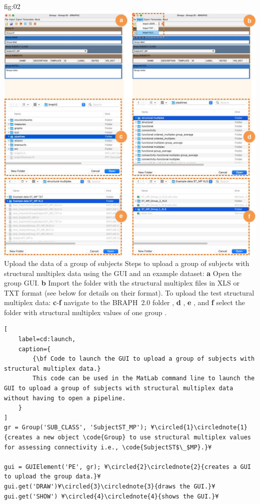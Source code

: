 \documentclass[justified]{tufte-handout}
\begin{document}
	{fig:02}
	{
	\includegraphics{fig02.jpg}
	}
	{Upload the data of a group of subjects}
	{
	Steps to upload a group of subjects with structural multiplex data using the GUI and an example dataset: 
	{\bf a} Open the group GUI.
	{\bf b} Import the folder with the structural multiplex files in XLS or TXT format (see below for details on their format).
	To upload the test structural multiplex data:
	{\bf c}-{\bf f} navigate to the BRAPH~2.0 folder , {\bf d} ,  {\bf e} , and {\bf f} select the folder with structural multiplex values of one group .
	}

%
\begin{lstlisting}[
	label=cd:launch,
	caption={
		{\bf Code to launch the GUI to upload a group of subjects with structural multiplex data.}
		This code can be used in the MatLab command line to launch the GUI to upload a group of subjects with structural multiplex data without having to open a pipeline.
	}
]
gr = Group('SUB_CLASS', 'SubjectST_MP'); ¥\circled{1}\circlednote{1}{creates a new object \code{Group} to use structural multiplex values for assessing connectivity i.e., \code{SubjectST$\_$MP}.}¥

gui = GUIElement('PE', gr); ¥\circled{2}\circlednote{2}{creates a GUI to upload the group data.}¥
gui.get('DRAW')¥\circled{3}\circlednote{3}{draws the GUI.}¥
gui.get('SHOW') ¥\circled{4}\circlednote{4}{shows the GUI.}¥
\end{lstlisting}
\end{document}
